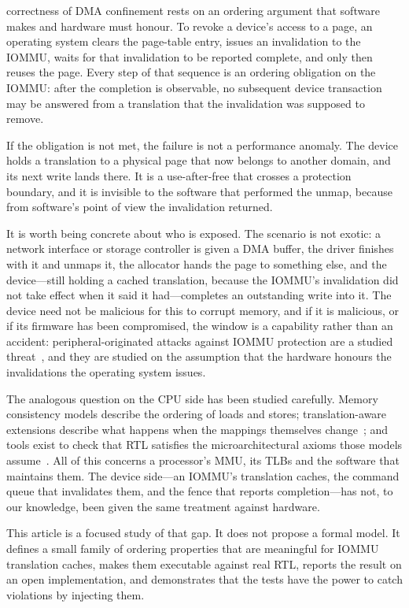 \documentclass[journal]{IEEEtran}
\begin{document}
 correctness of DMA confinement rests on an ordering
argument that software makes and hardware must honour. To revoke a device's
access to a page, an operating system clears the page-table entry, issues an
invalidation to the IOMMU, waits for that invalidation to be reported complete,
and only then reuses the page. Every step of that sequence is an ordering
obligation on the IOMMU: after the completion is observable, no subsequent
device transaction may be answered from a translation that the invalidation was
supposed to remove.

If the obligation is not met, the failure is not a performance anomaly. The
device holds a translation to a physical page that now belongs to another
domain, and its next write lands there. It is a use-after-free that crosses a
protection boundary, and it is invisible to the software that performed the
unmap, because from software's point of view the invalidation returned.

It is worth being concrete about who is exposed. The scenario is not exotic: a
network interface or storage controller is given a DMA buffer, the driver
finishes with it and unmaps it, the allocator hands the page to something else,
and the device---still holding a cached translation, because the IOMMU's
invalidation did not take effect when it said it had---completes an outstanding
write into it. The device need not be malicious for this to corrupt memory, and
if it is malicious, or if its firmware has been compromised, the window is a
capability rather than an accident: peripheral-originated attacks against IOMMU
protection are a studied threat~\cite{thunderclap}, and they are studied on the
assumption that the hardware honours the invalidations the operating system
issues.

The analogous question on the CPU side has been studied carefully. Memory
consistency models describe the ordering of loads and stores; translation-aware
extensions describe what happens when the mappings themselves
change~\cite{coatcheck,transform}; and tools exist to check that RTL satisfies
the microarchitectural axioms those models assume~\cite{rtlcheck,realitycheck}.
All of this concerns a processor's MMU, its TLBs and the software that
maintains them. The device side---an IOMMU's translation caches, the command
queue that invalidates them, and the fence that reports completion---has not,
to our knowledge, been given the same treatment against hardware.

This article is a focused study of that gap. It does not propose a formal model.
It defines a small family of ordering properties that are meaningful for IOMMU
translation caches, makes them executable against real RTL, reports the result
on an open implementation, and demonstrates that the tests have the power to
catch violations by injecting them.
\end{document}
